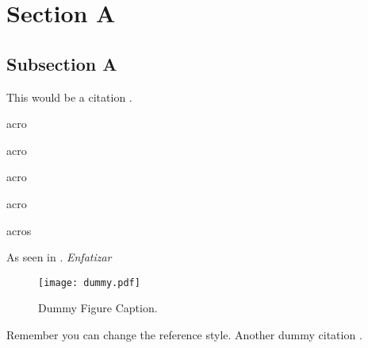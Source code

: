 \section{Section A}
\label{sec:sectiona}

\subsection{Subsection A}
\label{subsec:subasectionA}

This would be a citation \cite{dummy}.

\ac{acro} 

\acf{acro}

\acs{acro}

\acl{acro}

\acp{acro}

As seen in \cite{wiki}. \emph{Enfatizar}

\begin{figure}[H]
	\centering
		\texttt{[image: dummy.pdf]}
	\caption[Dummy Figure Caption for List of Figures.]{Dummy Figure Caption.}
	\label{fig:dummyfigure1}
\end{figure}

Remember you can change the reference style. Another dummy citation \cite{site}.